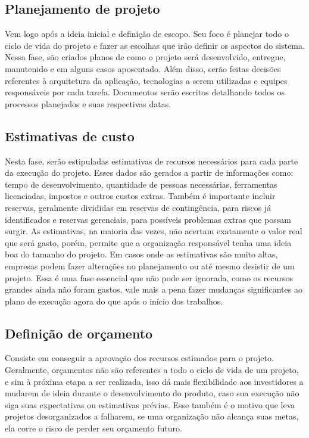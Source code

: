 \documentclass{article}
\begin{document}
\subsection{Planejamento de projeto}
Vem logo após a ideia inicial e definição de escopo. Seu foco é planejar todo o ciclo de vida do projeto e fazer as escolhas que irão definir os aspectos do sistema. Nessa fase, são criados planos de como o projeto será desenvolvido, entregue, manutenido e em alguns casos aposentado. Além disso, serão feitas decisões referentes à arquitetura da aplicação, tecnologias a serem utilizadas e equipes responsáveis por cada tarefa. Documentos serão escritos detalhando todos os processos planejados e suas respectivas datas.

\subsection{Estimativas de custo}
Nesta fase, serão estipuladas estimativas de recursos necessários para cada parte da execução do projeto. Esses dados são gerados a partir de informações como: tempo de desenvolvimento, quantidade de pessoas necessárias, ferramentas licenciadas, impostos e outros custos extras. Também é importante incluir reservas, geralmente divididas em reservas de contingência, para riscos já identificados e reservas gerenciais, para possíveis problemas extras que possam surgir. As estimativas, na maioria das vezes, não acertam exatamente o valor real que será gasto, porém, permite que a organização responsável tenha uma ideia boa do tamanho do projeto. Em casos onde as estimativas são muito altas, empresas podem fazer alterações no planejamento ou até mesmo desistir de um projeto. Essa é uma fase essencial que não pode ser ignorada, como os recursos grandes ainda não foram gastos, vale mais a pena fazer mudanças significantes ao plano de execução agora do que após o início dos trabalhos.

\subsection{Definição de orçamento}
Consiste em conseguir a aprovação dos recursos estimados para o projeto. Geralmente, orçamentos não são referentes a todo o ciclo de vida de um projeto, e sim à próxima etapa a ser realizada, isso dá mais flexibilidade aos investidores a mudarem de ideia durante o desenvolvimento do produto, caso sua execução não siga suas expectativas ou estimativas prévias. Esse também é o motivo que leva projetos desorganizados a falharem, se uma organização não alcança suas metas, ela corre o risco de perder seu orçamento futuro.
\end{document}
